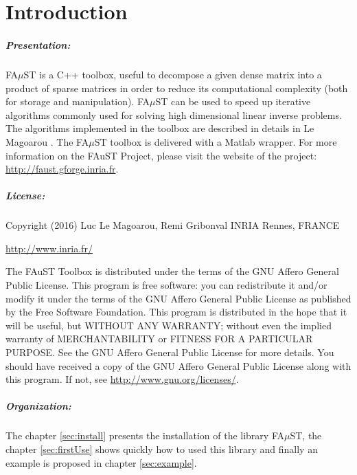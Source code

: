 
\chapter{Introduction}\label{sec:intro}

\paragraph{Presentation: }FA$\mu$ST is a C++ toolbox, useful to decompose a given dense matrix into a product of sparse matrices in order to reduce its computational complexity (both for storage and manipulation). 
FA$\mu$ST can be used to speed up iterative algorithms commonly used for solving high dimensional linear inverse problems. The algorithms implemented in the toolbox are described in details in Le Magoarou \cite{LeMagoarou2016}.
The FA$\mu$ST toolbox is delivered with a Matlab wrapper. 
For more information on the FAuST Project, please visit the website of the project: \url{http://faust.gforge.inria.fr}.

\paragraph{License: }Copyright (2016) Luc Le Magoarou, Remi Gribonval INRIA Rennes, FRANCE 
\begin{center} 
\url{http://www.inria.fr/}
\end{center}
The FAuST Toolbox is distributed under the terms of the GNU Affero General Public License. This program is free software: you can redistribute it and/or modify it under the terms of the GNU Affero General Public License as published by the Free Software Foundation. This program is distributed in the hope that it will be useful, but WITHOUT ANY WARRANTY; without even the implied warranty of MERCHANTABILITY or FITNESS FOR A PARTICULAR PURPOSE.  See the GNU Affero General Public License for more details. You should have received a copy of the GNU Affero General Public License along with this program.  If not, see \url{http://www.gnu.org/licenses/}.

\paragraph{Organization: }The chapter \ref{sec:install} presents the installation of the library FA$\mu$ST, the chapter \ref{sec:firstUse} shows quickly how to used this library and finally an example is proposed in chapter \ref{sec:example}. 